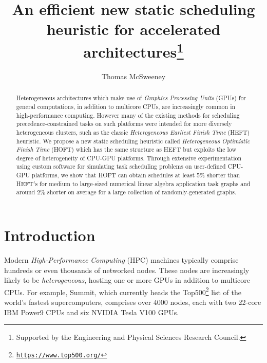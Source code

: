 \documentclass[runningheads]{llncs}
\begin{document}
%
\title{An efficient new static scheduling heuristic for accelerated architectures\thanks{Supported by the Engineering and Physical Sciences Research Council.}}
%
%
\author{Thomas McSweeney }
%
%
%
\maketitle              %
%
\begin{abstract}

Heterogeneous architectures which make use of {\em Graphics Processing Units} (GPUs) for general computations, in addition to multicore CPUs, are increasingly common in high-performance computing. However many of the existing methods for scheduling precedence-constrained tasks on such platforms were intended for more diversely heterogeneous clusters, such as the classic {\em Heterogeneous Earliest Finish Time} (HEFT) heuristic. We propose a new static scheduling heuristic called {\em Heterogeneous Optimistic Finish Time} (HOFT) which has the same structure as HEFT but exploits the low degree of heterogeneity of CPU-GPU platforms. Through extensive experimentation using custom software for simulating task scheduling problems on user-defined CPU-GPU platforms, we show that HOFT can obtain schedules at least $5\%$ shorter than HEFT's for medium to large-sized numerical linear algebra application task graphs and around $2\%$ shorter on average for a large collection of randomly-generated graphs.   


\end{abstract}


\section{Introduction}
\label{sect.intro}

Modern {\em High-Performance Computing} (HPC) machines typically comprise hundreds or even thousands of networked nodes. These nodes are increasingly likely to be {\em heterogeneous}, hosting one or more GPUs in addition to multicore CPUs. For example, Summit, which currently heads the Top500\footnote{\href{https://www.top500.org/}{{\tt \small https://www.top500.org/}}} list of the world's fastest supercomputers, comprises over $4000$ nodes, each with two 22-core IBM Power9 CPUs and six NVIDIA Tesla V100 GPUs. 
\end{document}
